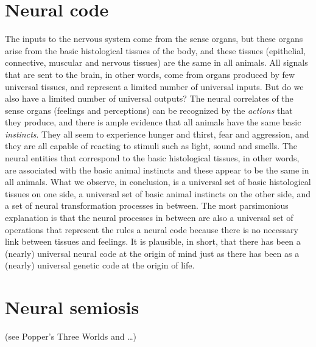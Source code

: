 \documentclass[12pt]{article}
\begin{document}
\section{Neural code}
The inputs to the nervous system come from the sense organs, but these organs arise from the basic histological tissues of the body, and these tissues (epithelial, connective, muscular and nervous tissues) are the same in all animals. All signals that are sent to the brain, in other words, come from organs produced by few universal tissues, and represent a limited number of universal inputs. But do we also have a limited number of universal outputs? The neural correlates of the sense organs (feelings and perceptions) can be recognized by the \textit{actions} that they produce, and there is ample evidence that all animals have the same basic \textit{instincts}. They all seem to experience hunger and thirst, fear and aggression, and they are all capable of reacting to stimuli such as light, sound and smells. The neural entities that correspond to the basic histological tissues, in other words, are associated with the basic animal instincts and these appear to be the same in all animals. What we observe, in conclusion, is a universal set of basic histological tissues on one side, a universal set of basic animal instincts on the other side, and a set of neural transformation processes in between. The most parsimonious explanation is that the neural processes in between are also a universal set of operations that represent the rules a neural code because there is no necessary link between tissues and feelings. It is plausible, in short, that there has been a (nearly) universal neural code at the origin of mind just as there has been as a (nearly) universal genetic code at the origin of life. 


\section{Neural semiosis} (see Popper's Three Worlds and …)	 
\end{document}
